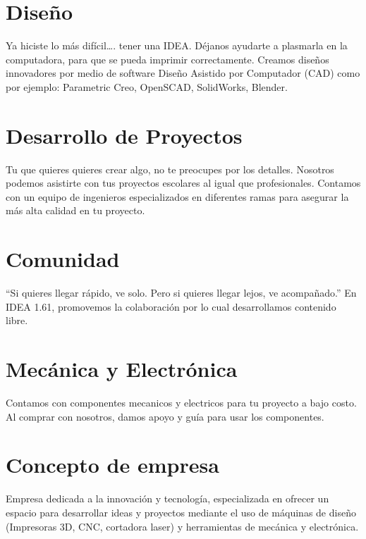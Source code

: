\documentclass[]{article}
\begin{document}
\section{Diseño}

Ya hiciste lo más difícil…. tener una IDEA. Déjanos ayudarte a plasmarla en la computadora, para que se pueda imprimir correctamente. Creamos diseños innovadores por medio de software Diseño Asistido por Computador (CAD) como por ejemplo: Parametric Creo, OpenSCAD, SolidWorks, Blender.\\

\section{Desarrollo de Proyectos}

Tu que quieres quieres crear algo, no te preocupes por los detalles. Nosotros podemos asistirte con tus proyectos escolares al igual que profesionales. Contamos con un equipo de ingenieros especializados en diferentes ramas para asegurar la más alta calidad en tu proyecto.\\

\section{Comunidad}

“Si quieres llegar rápido, ve solo. Pero si quieres llegar lejos, ve acompañado.” En IDEA 1.61, promovemos la colaboración por lo cual desarrollamos contenido libre.\\

\section{Mecánica y Electrónica}

Contamos con componentes mecanicos y electricos para tu proyecto a bajo costo. Al comprar con nosotros, damos apoyo y guía para usar los componentes.\\

\section{Concepto de empresa}
 
Empresa dedicada a la innovación y tecnología, especializada en ofrecer un espacio para desarrollar ideas y proyectos mediante el uso de máquinas de diseño (Impresoras 3D, CNC, cortadora laser) y herramientas de mecánica y electrónica.\\
\end{document}
